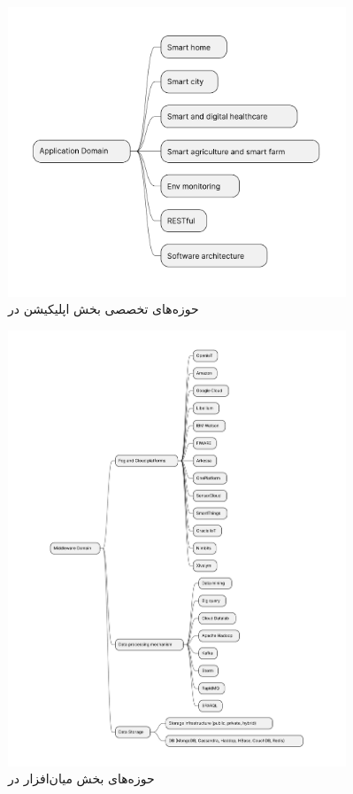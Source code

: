 \documentclass[a4paper]{article}
\begin{document}
\begin{figure}[H]
  \centering
  \includegraphics[width=0.9\textwidth]{./figures/IoT_application_domains.pdf}
  \caption{حوزه‌های تخصصی بخش اپلیکیشن در }
  \label{fig:iotApplicationDomains}
\end{figure}

\begin{figure}[H]
  \centering
  \includegraphics[width=0.9\textwidth]{./figures/IoT_middleware_domains.pdf}
  \caption{حوزه‌های بخش میان‌افزار در }
  \label{fig:iotMiddlewareDomains}
\end{figure}
\end{document}
